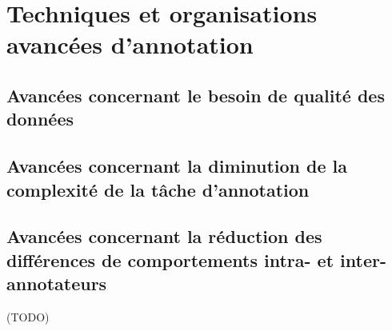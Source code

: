 \section{Techniques et organisations avancées d'annotation}
\label{section:2.4-AVANCEES-ANNOTATION}

	
	
	\subsection{Avancées concernant le besoin de qualité des données}
	\label{section:2.4.1-AVANCEES-ANNOTATION-ASPECT-DONNEES}
	
	
	\subsection{Avancées concernant la diminution de la complexité de la tâche d'annotation}
	\label{section:2.4.2-AVANCEES-ANNOTATION-ASPECT-COMPLEXITE}
	
	
	\subsection{Avancées concernant la réduction des différences de comportements intra- et inter-annotateurs}
	\label{section:2.4.3-AVANCEES-ANNOTATION-ASPECT-HUMAIN}
	
	
	\begin{leftBarSummary}
		\begin{todolist}
			\item[\itemok] (TODO)
		\end{todolist}
	\end{leftBarSummary}